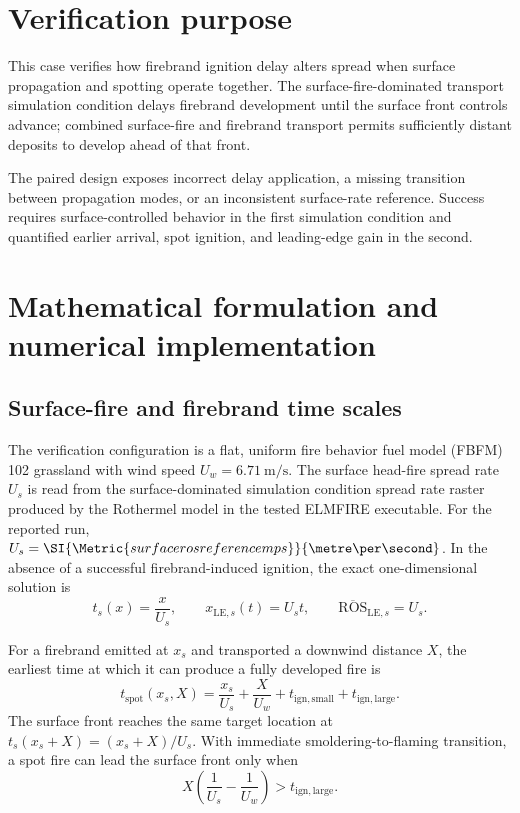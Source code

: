 \section{Verification purpose}

This case verifies how firebrand ignition delay alters spread when surface propagation and spotting operate together. The surface-fire-dominated transport simulation condition delays firebrand development until the surface front controls advance; combined surface-fire and firebrand transport permits sufficiently distant deposits to develop ahead of that front.

The paired design exposes incorrect delay application, a missing transition between propagation modes, or an inconsistent surface-rate reference. Success requires surface-controlled behavior in the first simulation condition and quantified earlier arrival, spot ignition, and leading-edge gain in the second.

\section{Mathematical formulation and numerical implementation}

\subsection{Surface-fire and firebrand time scales}

The verification configuration is a flat, uniform fire behavior fuel model (FBFM) 102 grassland with wind
speed $U_w=\SI{6.71}{\metre\per\second}$. The surface head-fire spread rate
$U_s$ is read from the surface-dominated simulation condition spread rate raster produced by the Rothermel
model in the tested ELMFIRE executable. For the reported run,
$U_s=\SI{\Metric{surfacerosreferencemps}}{\metre\per\second}$. In the absence of a successful
firebrand-induced ignition, the exact one-dimensional solution is
\begin{equation}
  t_s(x)=\frac{x}{U_s}, \qquad
  x_{\mathrm{LE},s}(t)=U_s t, \qquad
  \overline{\mathrm{ROS}}_{\mathrm{LE},s}=U_s .
  \label{eq:surface}
\end{equation}

For a firebrand emitted at $x_s$ and transported a downwind distance $X$, the
earliest time at which it can produce a fully developed fire is
\begin{equation}
 t_{\mathrm{spot}}(x_s,X)
 = \frac{x_s}{U_s}+\frac{X}{U_w}
   +t_{\mathrm{ign,small}}+t_{\mathrm{ign,large}} .
 \label{eq:spot-time}
\end{equation}
The surface front reaches the same target location at
$t_s(x_s+X)=(x_s+X)/U_s$. With immediate smoldering-to-flaming transition,
a spot fire can lead the surface front only when
\begin{equation}
 X\left(\frac{1}{U_s}-\frac{1}{U_w}\right)
 > t_{\mathrm{ign,large}} .
 \label{eq:lead-condition}
\end{equation}

